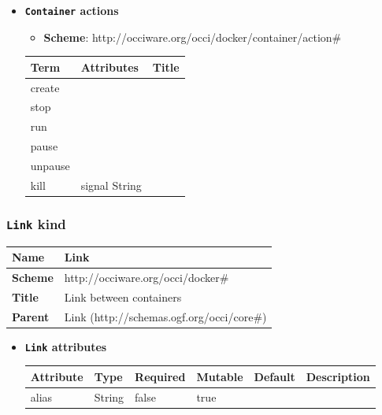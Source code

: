 \begin{itemize}
\item \textbf{\texttt{Container} actions}

\begin{itemize}
	\item \textbf{Scheme}: http://occiware.org/occi/docker/container/action\#
\end{itemize}

\begin{center}
\begin{tabular}{|l|l|l|}
  \hline
  \textbf{Term}  & \textbf{Attributes} & \textbf{Title} \\
  \hline  
  create & &  \\
  \hline
  stop & &  \\
  \hline
  run & &  \\
  \hline
  pause & &  \\
  \hline
  unpause & &  \\
  \hline
  kill &  signal String &  \\
  \hline
\end{tabular}
\end{center}
\end{itemize}


\subsubsection{\texttt{Link} kind}
\begin{center}
\begin{tabular}{|l|l|}
  \hline
  \textbf{Name} & Link \\
  \hline  
  \textbf{Scheme} & http://occiware.org/occi/docker\# \\
  \hline
  \textbf{Title} & Link between containers \\
  \hline
  \textbf{Parent} & Link (http://schemas.ogf.org/occi/core\#) \\
  \hline
\end{tabular}
\end{center}
\begin{itemize}
\item \textbf{\texttt{Link} attributes}

\begin{tabularx}{\textwidth}{|l|l|p{1.4cm}|p{1.3cm}|l|X|}
  \hline
  \textbf{Attribute} & \textbf{Type} & \textbf{Required} & \textbf{Mutable} & \textbf{Default} & \textbf{Description} \\
  \hline  
  alias & String & false & true &  &  \\
  \hline
\end{tabularx}
\end{itemize}



